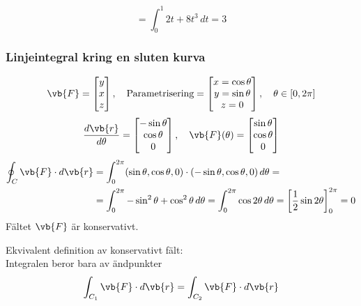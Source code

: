 \begin{example}[(forts.)]
\[ = \int_0^1 2t + 8t^3\,dt = 3 \]
\end{example}

\subsubsection*{Linjeintegral kring en sluten kurva}
\begin{example}
\[ \vb{F} = \begin{bmatrix} y \\ x \\ z \end{bmatrix}, \quad \text{Parametrisering} = \begin{bmatrix} x = \cos\theta \\ y = \sin\theta \\ z = 0 \end{bmatrix}, \quad \theta \in [0, 2\pi] \]
\[ \frac{d\vb{r}}{d\theta} = \begin{bmatrix} -\sin\theta \\ \cos\theta \\ 0 \end{bmatrix}, \quad \vb{F}(\theta) = \begin{bmatrix} \sin\theta \\ \cos\theta \\ 0 \end{bmatrix} \]
\begin{align*}
\oint_C \vb{F} \cdot d\vb{r} &= \int_0^{2\pi} (\sin\theta, \cos\theta, 0) \cdot (-\sin\theta, \cos\theta, 0)\,d\theta = \\
&= \int_0^{2\pi} -\sin^2\theta + \cos^2\theta\,d\theta = \int_0^{2\pi} \cos 2\theta\,d\theta = \left[ \frac{1}{2}\sin 2\theta \right]_0^{2\pi} = 0
\end{align*}
Fältet $\vb{F}$ är konservativt.
\end{example}

\begin{minipage}{0.35\linewidth}
\end{minipage}
\begin{minipage}{0.63\linewidth}
Ekvivalent definition av konservativt fält:\\
Integralen beror bara av ändpunkter
\[ \int_{C_1} \vb{F} \cdot d\vb{r} = \int_{C_2} \vb{F} \cdot d\vb{r} \]
\end{minipage}

